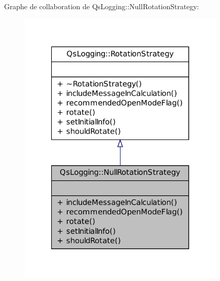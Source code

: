 Graphe de collaboration de Qs\-Logging\-:\-:Null\-Rotation\-Strategy\-:
\nopagebreak
\begin{figure}[H]
\begin{center}
\leavevmode
\includegraphics[width=280pt]{classQsLogging_1_1NullRotationStrategy__coll__graph}
\end{center}
\end{figure}
